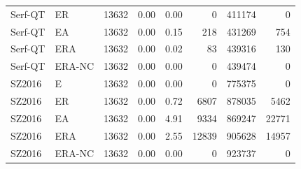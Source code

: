 \begin{table}[t]
\begin{tabular}{@{}llrrrrrr@{}}
Serf-QT & ER & 13632 & 0.00 & 0.00 & 0 & 411174 & 0 \\
Serf-QT & EA & 13632 & 0.00 & 0.15 & 218 & 431269 & 754 \\
Serf-QT & ERA & 13632 & 0.00 & 0.02 & 83 & 439316 & 130 \\
Serf-QT & ERA-NC & 13632 & 0.00 & 0.00 & 0 & 439474 & 0 \\
SZ2016 & E & 13632 & 0.00 & 0.00 & 0 & 775375 & 0 \\
SZ2016 & ER & 13632 & 0.00 & 0.72 & 6807 & 878035 & 5462 \\
SZ2016 & EA & 13632 & 0.00 & 4.91 & 9334 & 869247 & 22771 \\
SZ2016 & ERA & 13632 & 0.00 & 2.55 & 12839 & 905628 & 14957 \\
SZ2016 & ERA-NC & 13632 & 0.00 & 0.00 & 0 & 923737 & 0 \\
\bottomrule
\end{tabular}
\end{table}

